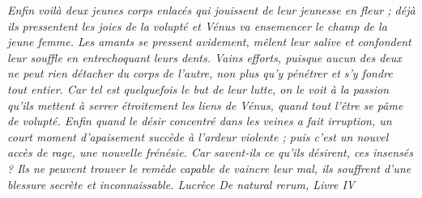\em{Enfin voilà deux jeunes corps enlacés qui jouissent de leur jeunesse en fleur ; déjà ils pressentent les joies de la
volupté et Vénus va ensemencer le champ de la jeune femme. Les amants se pressent avidement, mêlent leur
salive et confondent leur souffle en entrechoquant leurs dents. Vains efforts, puisque aucun des deux ne peut
rien détacher du corps de l’autre, non plus qu’y pénétrer et s’y fondre tout entier. Car tel est quelquefois le
but de leur lutte, on le voit à la passion qu’ils mettent à serrer étroitement les liens de Vénus, quand tout
l’être se pâme de volupté. Enfin quand le désir concentré dans les veines a fait irruption, un court moment
d’apaisement succède à l’ardeur violente ; puis c’est un nouvel accès de rage, une nouvelle frénésie. Car
savent-ils ce qu’ils désirent, ces insensés ? Ils ne peuvent trouver le remède capable de vaincre leur mal, ils
souffrent d’une blessure secrète et inconnaissable.}
Lucrèce De natural rerum, Livre IV


